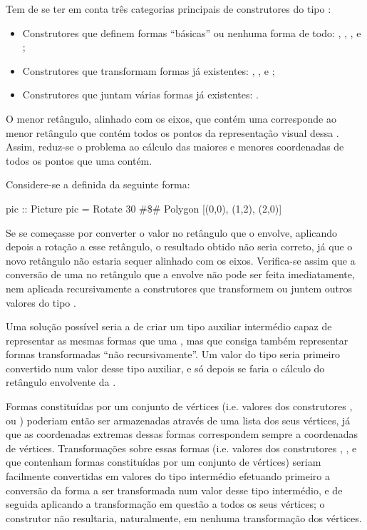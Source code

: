 \documentclass[a4paper]{article}
\begin{document}
Tem de se ter em conta três categorias principais de construtores do tipo :

\begin{itemize}
	\item Construtores que definem formas ``básicas'' ou nenhuma forma de todo: , , ,  e ;
	\item Construtores que transformam formas já existentes: , ,  e ;
	\item Construtores que juntam várias formas já existentes: .
\end{itemize}

O menor retângulo, alinhado com os eixos, que contém uma  corresponde ao menor retângulo que contém todos os pontos da representação visual dessa . Assim, reduz-se o problema ao cálculo das maiores e menores coordenadas de todos os pontos que uma  contém.

\bigskip

Considere-se a  definida da seguinte forma:

\begin{haskellblock}
pic :: Picture
pic = Rotate 30 #\$# Polygon [(0,0), (1,2), (2,0)]
\end{haskellblock}

Se se começasse por converter o valor  no retângulo que o envolve, aplicando depois a rotação a esse retângulo, o resultado obtido não seria correto, já que o novo retângulo não estaria sequer alinhado com os eixos. Verifica-se assim que a conversão de uma  no retângulo que a envolve não pode ser feita imediatamente, nem aplicada recursivamente a construtores que transformem ou juntem outros valores do tipo .

Uma solução possível seria a de criar um tipo auxiliar intermédio capaz de representar as mesmas formas que uma , mas que consiga também representar formas transformadas ``não recursivamente''. Um valor do tipo  seria primeiro convertido num valor desse tipo auxiliar, e só depois se faria o cálculo do retângulo envolvente da .

Formas constituídas por um conjunto de vértices (i.e. valores dos construtores ,  ou ) poderiam então ser armazenadas através de uma lista dos seus vértices, já que as coordenadas extremas dessas formas correspondem sempre a coordenadas de vértices. Transformações sobre essas formas (i.e. valores dos construtores , ,  e  que contenham formas constituídas por um conjunto de vértices) seriam facilmente convertidas em valores do tipo intermédio efetuando primeiro a conversão da forma a ser transformada num valor desse tipo intermédio, e de seguida aplicando a transformação em questão a todos os seus vértices; o construtor  não resultaria, naturalmente, em nenhuma transformação dos vértices.
\end{document}
